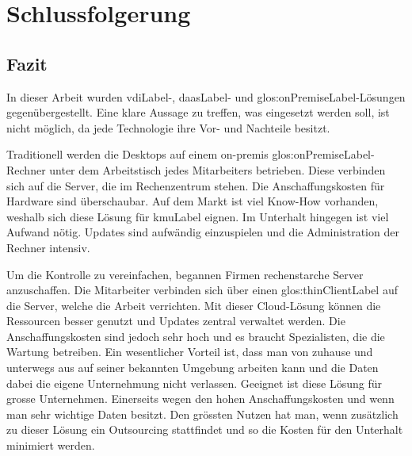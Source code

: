 \chapter{Schlussfolgerung}




\section{Fazit}
In dieser Arbeit wurden \Gls{vdiLabel}-, \Gls{daasLabel}- und \gls{glos:onPremiseLabel}-Lösungen gegenübergestellt. Eine klare Aussage zu treffen, was eingesetzt werden soll, ist nicht möglich, da jede Technologie ihre Vor- und Nachteile besitzt.

Traditionell werden die Desktops auf einem on-premis \gls{glos:onPremiseLabel}-Rechner unter dem Arbeitstisch jedes Mitarbeiters betrieben. Diese verbinden sich auf die Server, die im Rechenzentrum stehen. Die Anschaffungskosten für Hardware sind überschaubar. Auf dem Markt ist viel Know-How vorhanden, weshalb sich diese Lösung für \Gls{kmuLabel} eignen. Im Unterhalt hingegen ist viel Aufwand nötig. Updates sind aufwändig einzuspielen und die Administration der Rechner intensiv.

Um die Kontrolle zu vereinfachen, begannen Firmen rechenstarche Server anzuschaffen. Die Mitarbeiter verbinden sich über einen \Gls{glos:thinClientLabel} auf die Server, welche die Arbeit verrichten. Mit dieser Cloud-Lösung können die Ressourcen besser genutzt und Updates zentral verwaltet werden. Die Anschaffungskosten sind jedoch sehr hoch und es braucht Spezialisten, die die Wartung betreiben. Ein wesentlicher Vorteil ist, dass man von zuhause und unterwegs aus auf seiner bekannten Umgebung arbeiten kann und die Daten dabei die eigene Unternehmung nicht verlassen. Geeignet ist diese Lösung für grosse Unternehmen. Einerseits wegen den hohen Anschaffungskosten und wenn man sehr wichtige Daten besitzt. Den grössten Nutzen hat man, wenn zusätzlich zu dieser Lösung ein Outsourcing stattfindet und so die Kosten für den Unterhalt minimiert werden. 

